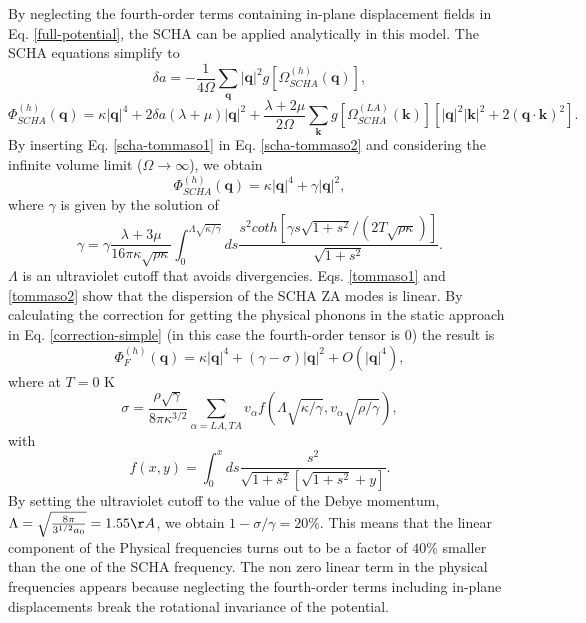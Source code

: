 By neglecting the fourth-order terms containing in-plane displacement fields in Eq. \ref{full-potential}, the SCHA 
can be applied analytically in this model. The SCHA equations simplify to
\begin{equation}
\label{scha-tommaso1}
\delta a=-\frac{1}{4\Omega}\sum_{\boldsymbol{q}}|\boldsymbol{q}|^{2}g[\Omega_{SCHA}^{(h)}(\boldsymbol{q})],
\end{equation}
\begin{equation}
\label{scha-tommaso2}
\Phi_{SCHA}^{(h)}(\boldsymbol{q})=\kappa|\boldsymbol{q}|^{4}+2\delta a(\lambda+\mu)|\boldsymbol{q}|^{2}+\frac{\lambda+2\mu}{2\Omega}\sum_{\boldsymbol{k}}g[\Omega_{SCHA}^{(LA)}(\boldsymbol{k})][|\boldsymbol{q}|^{2}|\boldsymbol{k}|^{2}+2(\boldsymbol{q}\cdot\boldsymbol{k})^{2}].
\end{equation}
By inserting Eq. \ref{scha-tommaso1} in Eq. \ref{scha-tommaso2} and considering the infinite volume limit 
($\Omega\rightarrow\infty$), we obtain
\begin{equation}
\label{tommaso1}
\Phi_{SCHA}^{(h)}(\boldsymbol{q})=\kappa|\boldsymbol{q}|^{4}+\gamma|\boldsymbol{q}|^{2},
\end{equation}
where $\gamma$ is given by the solution of
\begin{equation}
\label{tommaso2}
\gamma=\gamma\frac{\lambda+3\mu}{16\pi\kappa\sqrt{\rho\kappa}}\int_{0}^{\Lambda\sqrt{\kappa/\gamma}}ds\frac{s^{2}coth[\gamma s\sqrt{1+s^{2}}/(2T\sqrt{\rho\kappa})]}{\sqrt{1+s^{2}}}.
\end{equation}
$\Lambda$ is an ultraviolet cutoff that avoids divergencies.
Eqs. \ref{tommaso1} and \ref{tommaso2} show that the dispersion of the SCHA ZA modes is linear. By calculating the 
correction for getting the physical phonons in the static approach in Eq. \ref{correction-simple} (in this case the 
fourth-order tensor is $0$) the result is
\begin{equation}
\Phi_{F}^{(h)}(\boldsymbol{q})=\kappa|\boldsymbol{q}|^{4}+(\gamma-\sigma)|\boldsymbol{q}|^{2}+O(|\boldsymbol{q}|^{4}),
\end{equation}
where at $T=0$ K
\begin{equation}
\sigma=\frac{\rho\sqrt{\gamma}}{8\pi\kappa^{3/2}}\sum_{\alpha=LA,TA}v_{\alpha}f(\Lambda\sqrt{\kappa/\gamma},v_{\alpha}\sqrt{\rho/\gamma}),
\end{equation}
with
\begin{equation}
f(x,y)=\int_{0}^{x}ds\frac{s^{2}}{\sqrt{1+s^{2}}[\sqrt{1+s^{2}}+y]}.
\end{equation}
By setting the ultraviolet cutoff to the value of the Debye momentum, 
$\Lambda=\sqrt{\frac{8\pi}{3^{1/2}a_{0}}}=1.55\AA$, we obtain $1-\sigma/\gamma=20\%$. This means that the linear 
component of the Physical frequencies turns out to be a factor of $40\%$ smaller than the one of the SCHA frequency. 
The non zero linear term in the physical frequencies appears because neglecting the fourth-order terms including 
in-plane displacements break the rotational invariance of the potential.
